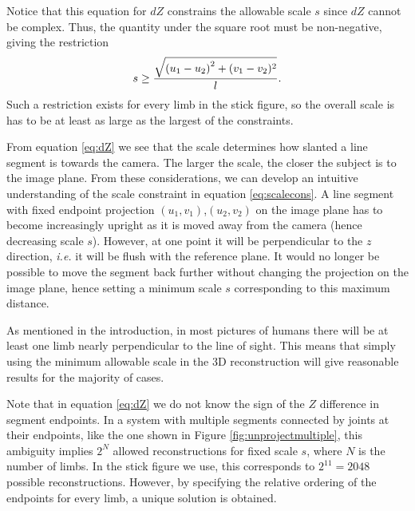 \documentclass[final]{article}
\begin{document}
\begin{spacing}{1.1}
Notice that this equation for $dZ$ constrains the allowable scale $s$ since $dZ$ cannot be complex. Thus, the quantity under the square root must be non-negative, giving the restriction
\begin{align}
  s \geq \frac{\sqrt{\qty(u_1 - u_2)^2 + (v_1 - v_2)^2}}{l}.
  \label{eq:scalecons}
\end{align}
Such a restriction exists for every limb in the stick figure, so the overall scale is has to be at least as large as the largest of the constraints. 

From equation \ref{eq:dZ} we see that the scale determines how slanted a line segment is towards the camera. The larger the scale, the closer the subject is to the image plane. From these considerations, we can develop an intuitive understanding of the scale constraint in equation \ref{eq:scalecons}. A line segment with fixed endpoint projection $(u_1,v_1)$,$(u_2,v_2)$ on the image plane has to become increasingly upright as it is moved away from the camera (hence decreasing scale $s$). However, at one point it will be perpendicular to the $z$ direction, \emph{i.e.} it will be flush with the reference plane. It would no longer be possible to move the segment back further without changing the projection on the image plane, hence setting a minimum scale $s$ corresponding to this maximum distance.

As mentioned in the introduction, in most pictures of humans there will be at least one limb nearly perpendicular to the line of sight. This means that simply using the minimum allowable scale in the 3D reconstruction will give reasonable results for the majority of cases.

Note that in equation \ref{eq:dZ} we do not know the sign of the $Z$ difference in segment endpoints. In a system with multiple segments connected by joints at their endpoints, like the one shown in Figure \ref{fig:unprojectmultiple}, this ambiguity implies $2^N$ allowed reconstructions for fixed scale $s$, where $N$ is the number of limbs. In the stick figure we use, this corresponds to $2^{11} = 2048$ possible reconstructions. However, by specifying the relative ordering of the endpoints for every limb, a unique solution is obtained.


\end{spacing}
\end{document}
